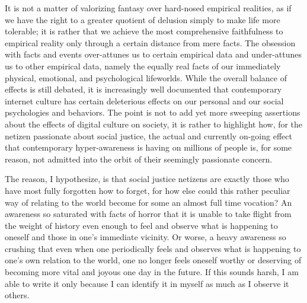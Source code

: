 \documentclass[a4paper,12pt,margin=.5in]{article}
\begin{document}
It is not a matter of valorizing fantasy over hard-nosed empirical
realities, as if we have the right to a greater quotient of delusion
simply to make life more tolerable; it is rather that we achieve the
most comprehensive faithfulness to empirical reality only through a
certain distance from mere facts. The obsession with facts and events
over-attunes us to certain empirical data and under-attunes us to other
empirical data, namely the equally real facts of our immediately
physical, emotional, and psychological lifeworlds. While the overall
balance of effects is still debated, it is increasingly well documented
that contemporary internet culture has certain deleterious effects on
our personal and our social psychologies and behaviors. The point is not
to add yet more sweeping assertions about the effects of digital culture
on society, it is rather to highlight how, for the netizen passionate
about social justice, the actual and currently on-going effect that
contemporary hyper-awareness is having on millions of people is, for
some reason, not admitted into the orbit of their seemingly passionate
concern.

The reason, I hypothesize, is that social justice netizens are exactly
those who have most fully forgotten how to forget, for how else could
this rather peculiar way of relating to the world become for some an
almost full time vocation? An awareness so saturated with facts of
horror that it is unable to take flight from the weight of history even
enough to feel and observe what is happening to oneself and those in
one's immediate vicinity. Or worse, a heavy awareness so crushing that
even when one periodically feels and observes what is happening to one's
own relation to the world, one no longer feels oneself worthy or
deserving of becoming more vital and joyous one day in the future. If
this sounds harsh, I am able to write it only because I can identify it
in myself as much as I observe it others.
\end{document}
